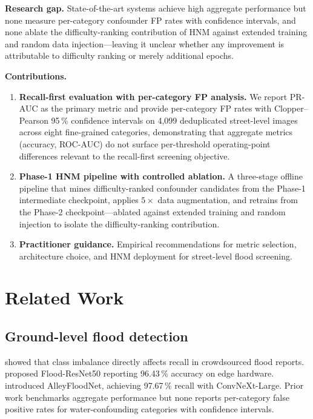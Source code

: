 \documentclass[a4paper,fleqn]{cas-sc}
\newcommand{\PR}{PR-AUC\xspace}
\newcommand{\CP}{Clopper--Pearson\xspace}
\begin{document}
\textbf{Research gap.}
State-of-the-art systems \citep{Lee2025,Khan2023} achieve high aggregate
performance but none measure per-category confounder FP rates with confidence
intervals, and none ablate the difficulty-ranking contribution of HNM against
extended training and random data injection---leaving it unclear whether any
improvement is attributable to difficulty ranking or merely additional epochs.

\textbf{Contributions.}
\begin{enumerate}
  \item \textbf{Recall-first evaluation with per-category FP analysis.}
        We report \PR{} as the primary metric and provide per-category FP rates
        with \CP{} 95\,\% confidence intervals on 4,099 deduplicated street-level
        images across eight fine-grained categories, demonstrating that aggregate
        metrics (accuracy, ROC-AUC) do not surface per-threshold operating-point
        differences relevant to the recall-first screening objective.

  \item \textbf{Phase-1 HNM pipeline with controlled ablation.}
        A three-stage offline pipeline that mines difficulty-ranked confounder
        candidates from the Phase-1 intermediate checkpoint, applies $5\times$
        data augmentation, and retrains from the Phase-2 checkpoint---ablated
        against extended training and random injection to isolate the
        difficulty-ranking contribution.

  \item \textbf{Practitioner guidance.}
        Empirical recommendations for metric selection, architecture choice,
        and HNM deployment for street-level flood screening.
\end{enumerate}

\section{Related Work}
\label{sec:related}

\subsection{Ground-level flood detection}
\label{sec:related:ground}

\citet{Esparza2022} showed that class imbalance directly affects recall in crowdsourced flood reports.
\citet{Khan2023} proposed Flood-ResNet50 reporting 96.43\,\% accuracy on edge hardware.
\citet{Lee2025} introduced AlleyFloodNet, achieving 97.67\,\% recall with ConvNeXt-Large.
Prior work \citep{Papadimos2023,Alam2023} benchmarks aggregate performance but none reports
per-category false positive rates for water-confounding categories with confidence intervals.
\end{document}
